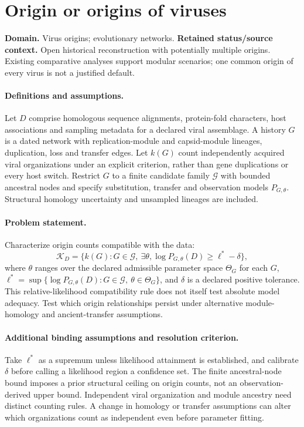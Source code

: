\documentclass[11pt]{article}
\begin{document}
\section*{Origin or origins of viruses}
\label{prob:304}
\label{rank:196}
\par\smallskip

\noindent\textbf{Domain.} Virus origins; evolutionary networks. \quad \textbf{Retained status/source context.} Open historical reconstruction with potentially multiple origins. Existing comparative analyses support modular scenarios; one common origin of every virus is not a justified default.

\paragraph{Definitions and assumptions.} Let $D$ comprise homologous sequence alignments, protein-fold characters, host associations and sampling metadata for a declared viral assemblage. A history $G$ is a dated network with replication-module and capsid-module lineages, duplication, loss and transfer edges. Let $k(G)$ count independently acquired viral organizations under an explicit criterion, rather than gene duplications or every host switch. Restrict $G$ to a finite candidate family $\mathcal G$ with bounded ancestral nodes and specify substitution, transfer and observation models $P_{G,\theta}$. Structural homology uncertainty and unsampled lineages are included.

\paragraph{Problem statement.} Characterize origin counts compatible with the data:
    \[\mathcal K_D=\{k(G):G\in\mathcal G,\ \exists\theta,
    \log P_{G,\theta}(D)\geq\ell^*-\delta\},\]
    where $\theta$ ranges over the declared admissible parameter space $\Theta_G$ for each $G$, $\ell^*=\sup\{\log P_{G,\theta}(D):G\in\mathcal G,\ \theta\in\Theta_G\}$, and $\delta$ is a declared positive tolerance. This relative-likelihood compatibility rule does not itself test absolute model adequacy. Test which origin relationships persist under alternative module-homology and ancient-transfer assumptions.

\paragraph{Additional binding assumptions and resolution criterion.} Take $\ell^*$ as a supremum unless likelihood attainment is established, and calibrate $\delta$ before calling a likelihood region a confidence set. The finite ancestral-node bound imposes a prior structural ceiling on origin counts, not an observation-derived upper bound. Independent viral organization and module ancestry need distinct counting rules. A change in homology or transfer assumptions can alter which organizations count as independent even before parameter fitting.
\end{document}
